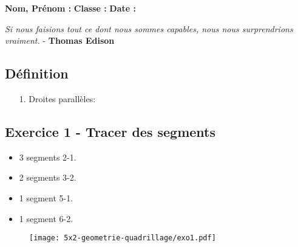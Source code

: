 



\textbf{Nom, Prénom :} \hspace{8cm} \textbf{Classe :} \hspace{3cm} \textbf{Date :}\\
\vspace{-0.8cm}
\begin{center}
  \textit{Si nous faisions tout ce dont nous sommes capables, nous nous surprendrions vraiment.}  - \textbf{Thomas Edison}
\end{center}
\vspace{-0.8cm}

\subsection*{Définition}
  \begin{enumerate}
    \item[1.] Droites parallèles: \dotfill \\
    \Pointilles[1]
  \end{enumerate}

\begin{minipage}[t]{0.25\textwidth}
  \subsection*{Exercice 1 - Tracer des segments}
  \begin{itemize}
  \item 3 segments 2-1.
  \item 2 segments 3-2.
  \item 1 segment 5-1.
  \item 1 segment 6-2.
\end{itemize}
\end{minipage}
\begin{minipage}[t]{0.75\textwidth}
\begin{figure}[H]
  \centering
  \texttt{[image: 5x2-geometrie-quadrillage/exo1.pdf]}
\end{figure}
\end{minipage}

